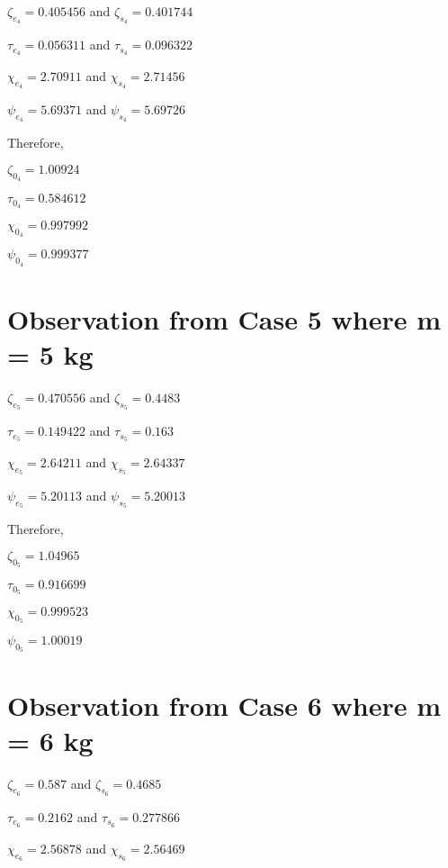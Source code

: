     {$\zeta_{e_4} = 0.405456$ and $\zeta_{s_4} = 0.401744$}
            
    {$\tau_{e_4} = 0.056311$ and $\tau_{s_4} = 0.096322$}
            
    {$\chi_{e_4} = 2.70911$ and $\chi_{s_4} = 2.71456$}
            
    {$\psi_{e_4} = 5.69371$ and $\psi_{s_4} = 5.69726$}
            
    {Therefore,}
            
    $\zeta_{0_4} = 1.00924$
            
    $\tau_{0_4} = 0.584612$
            
    $\chi_{0_4} = 0.997992$
            
    $\psi_{0_4} = 0.999377$    
            
        
        
\section{{Observation from Case 5 where m = 5 kg}}
        
    {$\zeta_{e_5} = 0.470556$ and $\zeta_{s_5} = 0.4483$}
            
    {$\tau_{e_5} = 0.149422$ and $\tau_{s_5} = 0.163$}
            
    {$\chi_{e_5} = 2.64211$ and $\chi_{s_5} = 2.64337$}
            
    {$\psi_{e_5} = 5.20113$ and $\psi_{s_5} = 5.20013$}
                
    {Therefore,}
            
    $\zeta_{0_5} = 1.04965$
            
    $\tau_{0_5} = 0.916699$
            
    $\chi_{0_5} = 0.999523$
            
    $\psi_{0_5} = 1.00019$    
            
        
        
\section{{Observation from Case 6 where m = 6 kg}}
        
    {$\zeta_{e_6} = 0.587$ and $\zeta_{s_6} = 0.4685$}
            
    {$\tau_{e_6} = 0.2162$ and $\tau_{s_6} = 0.277866$}
            
    {$\chi_{e_6} = 2.56878$ and $\chi_{s_6} = 2.56469$}
            

